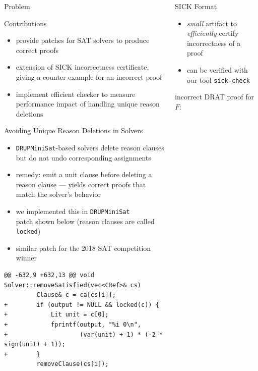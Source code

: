 \documentclass[final,hyperref={pdfpagelabels=true}]{beamer}
\begin{document}
\begin{frame}[fragile]
\begin{columns}[t]
\begin{column}{.45\textwidth}
\begin{block}{Problem}
    \end{block}

    \begin{block}{Contributions}
        \begin{itemize}
		\item provide patches for SAT solvers to produce correct proofs
		\item extension of SICK incorrectness certificate, giving
		a counter-example for an incorrect proof
		\item implement efficient checker to measure performance
		impact of handling unique reason deletions
        \end{itemize}
    \end{block}


    \begin{block}{Avoiding Unique Reason Deletions in Solvers}
	\begin{itemize}
	    \item \texttt{DRUPMiniSat}-based solvers delete reason clauses
	    but do not undo corresponding assignments
            \item remedy: emit a unit clause before deleting a reason clause
            --- yields correct proofs that match the solver's behavior
	    \item we implemented this in \texttt{DRUPMiniSat}\\
		patch shown below (reason clauses are called \texttt{locked})
            \item similar patch for the 2018 SAT competition winner
	\end{itemize}
	\vspace{0.5cm}
        {\footnotesize
            \begin{verbatim}
@@ -632,9 +632,13 @@ void Solver::removeSatisfied(vec<CRef>& cs)
         Clause& c = ca[cs[i]];
+        if (output != NULL && locked(c)) {
+            Lit unit = c[0];
+            fprintf(output, "%i 0\n",
+                    (var(unit) + 1) * (-2 * sign(unit) + 1));
+        }
         removeClause(cs[i]);
            \end{verbatim}
        }
    \end{block}
    \end{column}

    \begin{column}{.45\textwidth}
    \begin{block}{SICK Format}
        \begin{itemize}
            \item \emph{small} artifact to \emph{efficiently} certify
            incorrectness of a proof
            \item can be verified with our tool \texttt{sick-check}
        \end{itemize}
        \vspace{.5cm}
        incorrect DRAT proof for $F$:


\end{block}
\end{column}
\end{columns}
\end{frame}
\end{document}
